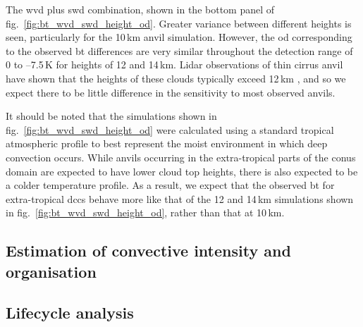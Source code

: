 The \acrshort{wvd} plus \acrshort{swd} combination, shown in the bottom panel of fig.~\ref{fig:bt_wvd_swd_height_od}.
Greater variance between different heights is seen, particularly for the 10\,\unit{km} anvil simulation.
However, the \acrshort{od} corresponding to the observed \acrshort{bt} differences are very similar throughout the detection range of 0 to --7.5\,\unit{K} for heights of 12 and 14\,\unit{km}.
Lidar observations of thin cirrus anvil have shown that the heights of these clouds typically exceed 12\,\unit{km} \citep{wall_observational_2020, horner_evolution_2023}, and so we expect there to be little difference in the sensitivity to most observed anvils.

It should be noted that the simulations shown in fig.~\ref{fig:bt_wvd_swd_height_od} were calculated using a standard tropical atmospheric profile to best represent the moist environment in which deep convection occurs.
While anvils occurring in the extra-tropical parts of the \acrshort{conus} domain are expected to have lower cloud top heights, there is also expected to be a colder temperature profile.
As a result, we expect that the observed \acrshort{bt} for extra-tropical \acrshort{dcc}s behave more like that of the 12 and 14\,\unit{km} simulations shown in fig.~\ref{fig:bt_wvd_swd_height_od}, rather than that at 10\,\unit{km}.



\subsection{Estimation of convective intensity and organisation}


\subsection{Lifecycle analysis} \label{sec:lifecycle_definition}

